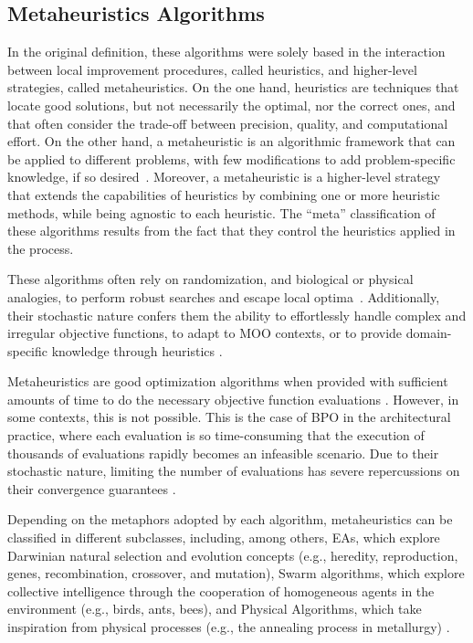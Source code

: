 	\subsection{Metaheuristics Algorithms}
	\label{ssec:metaheuristics}
	In the original definition, these algorithms were solely based in the interaction between local improvement procedures, called heuristics, and higher-level strategies, called metaheuristics. On the one hand, heuristics are techniques that locate good solutions, but not necessarily the optimal, nor the correct ones, and that often consider the trade-off between precision, quality, and computational effort. On the other hand, a metaheuristic is an algorithmic framework that can be applied to different problems, with few modifications to add problem-specific knowledge, if so desired~\cite{Glover2003Metaheuristics}. Moreover, a metaheuristic is a higher-level strategy that extends the capabilities of heuristics by combining one or more heuristic methods, while being agnostic to each heuristic. The ``meta'' classification of these algorithms results from the fact that they control the heuristics applied in the process.
	
	These algorithms often rely on randomization, and biological or physical analogies, to perform robust searches and escape local optima~\cite{Glover2003Metaheuristics}. Additionally, their stochastic nature confers them the ability to effortlessly handle complex and irregular objective functions, to adapt to \ac{MOO} contexts, or to provide domain-specific knowledge through heuristics \cite{Wortmann2017GABESTCHOICE}.
	
	Metaheuristics are good optimization algorithms when provided with sufficient amounts of time to do the necessary objective function evaluations \cite{Conn2009}. However, in some contexts, this is not possible. This is the case of \ac{BPO} in the architectural practice, where each evaluation is so time-consuming that the execution of thousands of evaluations rapidly becomes an infeasible scenario. Due to their stochastic nature, limiting the number of evaluations has severe repercussions on their convergence guarantees \cite{Hasancebi2009}.
	
	Depending on the metaphors adopted by each algorithm, metaheuristics can be classified in different subclasses, including, among others, \acp{EA}, which explore Darwinian natural selection and evolution concepts (e.g., heredity, reproduction, genes, recombination, crossover, and mutation), Swarm algorithms, which explore collective intelligence through the cooperation of homogeneous agents in the environment (e.g., birds, ants, bees), and Physical Algorithms, which take inspiration from physical processes (e.g., the annealing process in metallurgy) \cite{Brownlee2011}.
	
